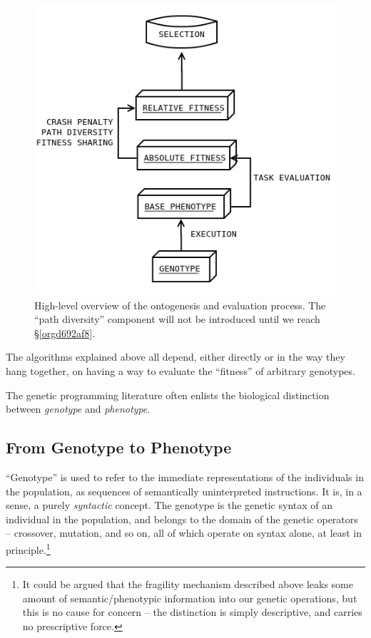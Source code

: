 \documentclass[12pt,glossary]{dalthesis}
\begin{document}
\begin{figure}[htbp]
\centering
\includegraphics[width=.9\linewidth]{../images/evaluation_model.png}
\caption{\label{fig:orga309883}
High-level overview of the ontogenesis and evaluation process. The ``path diversity'' component will not be introduced until we reach \S \ref{orgd692af8}.}
\end{figure}

The algorithms explained above all depend, either directly or in the way they
hang together, on having a way to evaluate the ``fitness'' of arbitrary genotypes.

The genetic programming literature often enlists the biological distinction
between \emph{genotype} and \emph{phenotype}.

\subsection{From Genotype to Phenotype}
\label{sec:org21cf6b7}
\label{orgc499d46}

``Genotype'' is used to refer to the immediate representations of the individuals
in the population, as sequences of semantically uninterpreted instructions. It
is, in a sense, a purely \emph{syntactic} concept. The genotype is the genetic syntax
of an individual in the population, and belongs to the domain of the genetic
operators -- crossover, mutation, and so on, all of which operate on syntax alone,
at least in principle.\footnote{It could be argued that the fragility mechanism described above leaks some
  amount of semantic/phenotypic information into our genetic operations, but
  this is no cause for concern -- the distinction is simply descriptive, and
  carries no prescriptive force.}
\end{document}

